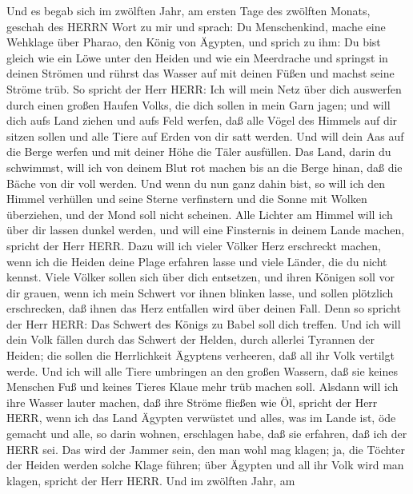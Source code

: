  Und es begab sich im zwölften Jahr, am ersten Tage des
zwölften Monats, geschah des HERRN Wort zu mir und sprach: 
Du Menschenkind, mache eine Wehklage über Pharao, den König von Ägypten,
und sprich zu ihm: Du bist gleich wie ein Löwe unter den Heiden und wie
ein Meerdrache und springst in deinen Strömen und rührst das Wasser auf
mit deinen Füßen und machst seine Ströme trüb.  So spricht
der Herr HERR: Ich will mein Netz über dich auswerfen durch einen großen
Haufen Volks, die dich sollen in mein Garn jagen;  und will
dich aufs Land ziehen und aufs Feld werfen, daß alle Vögel des Himmels
auf dir sitzen sollen und alle Tiere auf Erden von dir satt werden.
 Und will dein Aas auf die Berge werfen und mit deiner Höhe
die Täler ausfüllen.  Das Land, darin du schwimmst, will ich
von deinem Blut rot machen bis an die Berge hinan, daß die Bäche von dir
voll werden.  Und wenn du nun ganz dahin bist, so will ich
den Himmel verhüllen und seine Sterne verfinstern und die Sonne mit
Wolken überziehen, und der Mond soll nicht scheinen.  Alle
Lichter am Himmel will ich über dir lassen dunkel werden, und will eine
Finsternis in deinem Lande machen, spricht der Herr HERR. 
Dazu will ich vieler Völker Herz erschreckt machen, wenn ich die Heiden
deine Plage erfahren lasse und viele Länder, die du nicht kennst.
 Viele Völker sollen sich über dich entsetzen, und ihren
Königen soll vor dir grauen, wenn ich mein Schwert vor ihnen blinken
lasse, und sollen plötzlich erschrecken, daß ihnen das Herz entfallen
wird über deinen Fall.  Denn so spricht der Herr HERR: Das
Schwert des Königs zu Babel soll dich treffen.  Und ich
will dein Volk fällen durch das Schwert der Helden, durch allerlei
Tyrannen der Heiden; die sollen die Herrlichkeit Ägyptens verheeren, daß
all ihr Volk vertilgt werde.  Und ich will alle Tiere
umbringen an den großen Wassern, daß sie keines Menschen Fuß und keines
Tieres Klaue mehr trüb machen soll.  Alsdann will ich ihre
Wasser lauter machen, daß ihre Ströme fließen wie Öl, spricht der Herr
HERR,  wenn ich das Land Ägypten verwüstet und alles, was
im Lande ist, öde gemacht und alle, so darin wohnen, erschlagen habe,
daß sie erfahren, daß ich der HERR sei.  Das wird der
Jammer sein, den man wohl mag klagen; ja, die Töchter der Heiden werden
solche Klage führen; über Ägypten und all ihr Volk wird man klagen,
spricht der Herr HERR.  Und im zwölften Jahr, am
